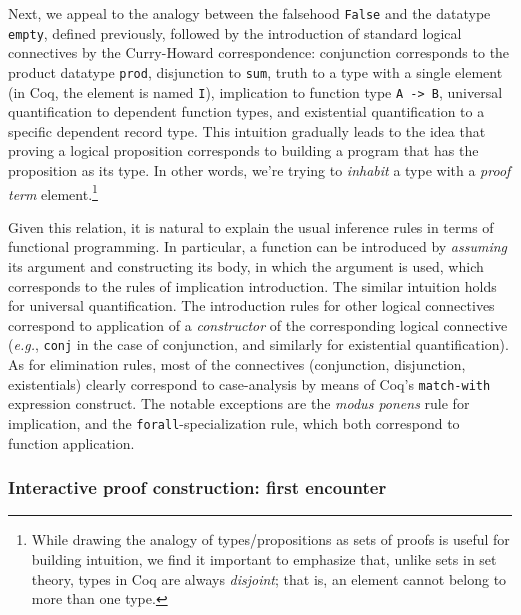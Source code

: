 \documentclass[blockstyle,preprint]{sigplanconf}
\newcommand{\is}[1]{\textcolor{blue}{(Ilya: {#1})}}
\newcommand{\an}[1]{\textcolor{red}{(Aleks: {#1})}}
\newcommand{\code}[1]{\lstinline{#1}}
\newcommand{\eg}{\emph{e.g.}\xspace}
\begin{document}
Next, we appeal to the analogy between the falsehood \code{False} and
the datatype \code{empty}, defined previously, followed by the
introduction of standard logical connectives by the Curry-Howard
correspondence: conjunction corresponds to the product datatype
\code{prod}, disjunction to \code{sum}, truth to a type with a single
element (in Coq, the element is named \code{I}), implication to
function type \code{A -> B}, universal quantification to dependent
function types, and existential quantification to a specific dependent
record type. This intuition gradually leads to the idea that proving a
logical proposition corresponds to building a program that has the
proposition as its type. In other words, we're trying to
\emph{inhabit} a type with a \emph{proof term} element.\footnote{While
  drawing the analogy of types/propositions as sets of proofs is
  useful for building intuition, we find it important to emphasize
  that, unlike sets in set theory, types in Coq are always
  \emph{disjoint}; that is, an element cannot belong to more than one
  type.}

Given this relation, it is natural to explain the usual inference rules
in terms of functional programming.
%
In particular, a function can be introduced by \emph{assuming} its
argument and constructing its body, in which the argument is used,
which corresponds to the rules of implication introduction. The
similar intuition holds for universal quantification. The introduction
rules for other logical connectives correspond to application of a
\emph{constructor} of the corresponding logical connective (\eg,
\code{conj} in the case of conjunction, and similarly for existential
quantification). As for elimination rules, most of the connectives
(conjunction, disjunction, existentials) clearly correspond to
case-analysis by means of Coq's \code{match-with} expression
construct. 
%
%
 The notable exceptions are the \emph{modus ponens}
rule for implication, and the \code{forall}-specialization rule, which
both correspond to function application.

\subsubsection{Interactive proof construction: first encounter}
\label{sec:inter-proof-constr}
\end{document}
